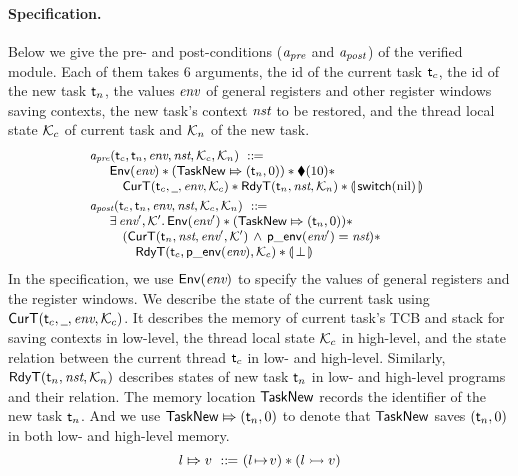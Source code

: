 \paragraph{\textbf{Specification.}}
Below we give the pre- and post-conditions
($\textit{a}_\textit{pre}$ and $\textit{a}_\textit{post}$) of the verified module.
Each of them takes 6 arguments,
the id of the current task $\textsf{t}_c$, the id of the new
task $\textsf{t}_n$, the values $\textit{env}$ of general registers and
other register windows saving contexts,
the new task's context $\textit{nst}$ to be restored,
and the thread local state $\mathcal{K}_c$
of current task and $\mathcal{K}_n$ of the new task.
\[
    \small
    \begin{array}{l}
        \textit{a}_\textit{pre}(\textsf{t}_c, \textsf{t}_n, \textit{env}, \textit{nst}, \mathcal{K}_c, \mathcal{K}_n)
        \ ::\!\!{=} \\
        \quad
        \begin{array}{l}
            \mathsf{Env}({\textit{env}}) *
            ({\mathsf{TaskNew}}\Mapsto{(\textsf{t}_n, 0)}) *
            \blacklozenge({10}) * \\
            \quad
            \textsf{CurT}({\textsf{t}_c}, {\underline{\ \,}}, {\textit{env}}, {\mathcal{K}_c}) *
            \textsf{RdyT}({\textsf{t}_n}, {\textit{nst}}, {\mathcal{K}_n}) *
            \llparenthesis {\, \mathsf{switch}(\text{nil}) \,} \rrparenthesis
        \end{array}
        \\
        \\[-8pt]
        \textit{a}_\textit{post}(\textsf{t}_c, \textsf{t}_n, \textit{env}, \textit{nst}, \mathcal{K}_c, \mathcal{K}_n)
        \ ::\!\!{=} \\
        \quad
        \begin{array}{l}
            \exists \, \textit{env}', \mathcal{K}'. \, \mathsf{Env}({\textit{env}'})
            * ({\mathsf{TaskNew}}\Mapsto{(\textsf{t}_n, 0)})
            * \
            \\
            \quad
            (\textsf{CurT}({\textsf{t}_n}, {\textit{nst}}, {\textit{env}'}, {\mathcal{K}'})
            \,\land\,\mathsf{p\_env}({\textit{env}'}) = \textit{nst}) *
            \\
            \qquad
            \textsf{RdyT}({\textsf{t}_c}, {\mathsf{p\_env}({\textit{env}})}, {\mathcal{K}_c}) *
            \llparenthesis {\, \perp\,} \rrparenthesis
        \end{array}
    \end{array}
\]
In the specification,
we use $\mathsf{Env}({\textit{env}})$ to specify the values of
general registers and the register windows.
We describe the state
of the current task
using $\textsf{CurT}({\textsf{t}_c}, {\underline{\ \,}}, {\textit{env}}, {\mathcal{K}_c})$.
It describes the memory of current task's TCB
and stack for saving contexts in low-level,
the thread local state $\mathcal{K}_c$ in high-level,
and the state relation between the current thread $\textsf{t}_c$
in low- and high-level.
Similarly, $\textsf{RdyT}({\textsf{t}_n}, {\textit{nst}}, {\mathcal{K}_n})$
describes states of new task $\textsf{t}_n$ in low- and high-level
programs and their relation.
The memory location
$\mathsf{TaskNew}$ records the identifier of the new task $\textsf{t}_n$.
And we use ${\mathsf{TaskNew}}\Mapsto{(\textsf{t}_n, 0)}$ to denote that
$\mathsf{TaskNew}$ saves $(\textsf{t}_n, 0)$
in both low- and high-level memory.
\[
    {l}\Mapsto{v} \ ::\!\!{=} \
    ({l} \!\mapsto\! {v}) * ({l} \rightarrowtail {v})
\]

